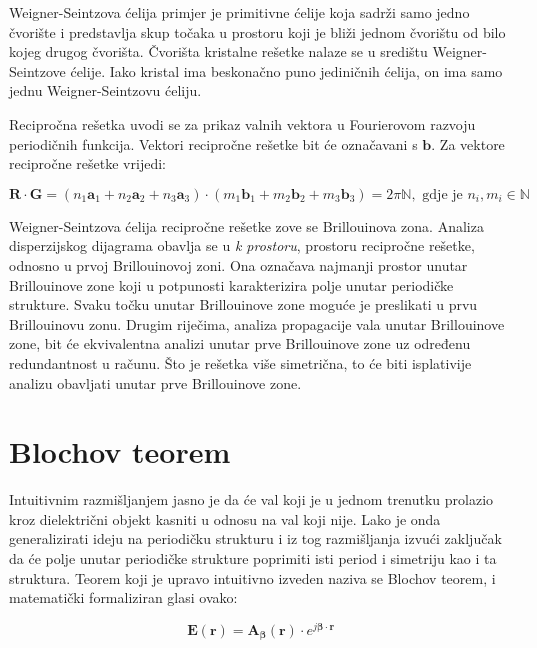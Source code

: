 \documentclass[utf8, seminar]{fer}
\begin{document}
Weigner-Seintzova ćelija primjer je primitivne ćelije koja sadrži samo jedno
čvorište i predstavlja skup točaka u prostoru koji je bliži jednom čvorištu
od bilo kojeg drugog čvorišta. Čvorišta kristalne rešetke nalaze se u središtu
Weigner-Seintzove ćelije. Iako kristal ima beskonačno puno jediničnih ćelija,
on ima samo jednu Weigner-Seintzovu ćeliju.

Recipročna rešetka uvodi se za prikaz valnih vektora u Fourierovom razvoju
periodičnih funkcija. Vektori recipročne rešetke bit će označavani s $\mathbf{b}$.
Za vektore recipročne rešetke vrijedi:

\begin{equation}
	\mathbf{R} \cdot \mathbf{G} =
	(n_1\mathbf{a}_1 + n_2\mathbf{a}_2 + n_3\mathbf{a}_3)
	\cdot
	(m_1\mathbf{b}_1 + m_2\mathbf{b}_2 + m_3\mathbf{b}_3) = 2 \pi \mathbb{N},
		\text{ gdje je }n_i, m_i \in \mathbb{N}
\end{equation}


Weigner-Seintzova ćelija recipročne rešetke zove se Brillouinova zona. Analiza
disperzijskog dijagrama obavlja se u \textit{k prostoru}, prostoru recipročne
rešetke, odnosno u prvoj Brillouinovoj zoni. Ona označava najmanji
prostor unutar Brillouinove zone koji u potpunosti karakterizira polje unutar
periodičke strukture. Svaku točku unutar Brillouinove zone moguće je preslikati
u prvu Brillouinovu zonu. Drugim riječima, analiza propagacije vala unutar
Brillouinove zone, bit će ekvivalentna analizi unutar prve Brillouinove zone uz
određenu redundantnost u računu. Što je rešetka više simetrična, to će biti
isplativije analizu obavljati unutar prve Brillouinove zone.


\section{Blochov teorem}

Intuitivnim razmišljanjem jasno je da će val koji je u jednom trenutku prolazio
kroz dielektrični objekt kasniti u odnosu na val koji nije. Lako je onda
generalizirati ideju na periodičku strukturu i iz tog razmišljanja izvući
zaključak da će polje unutar periodičke strukture poprimiti isti period i
simetriju kao i ta struktura. Teorem koji je upravo intuitivno izveden naziva se
Blochov teorem, i matematički formaliziran glasi ovako:

\begin{equation} \label{eq:bloch}
	\mathbf{E}(\mathbf{r}) =
	\mathbf{A}_{\bm{\beta}}(\mathbf{r}) \cdot
		e^{j {\bm{\beta}} \cdot \mathbf{r}}
\end{equation}
\end{document}
